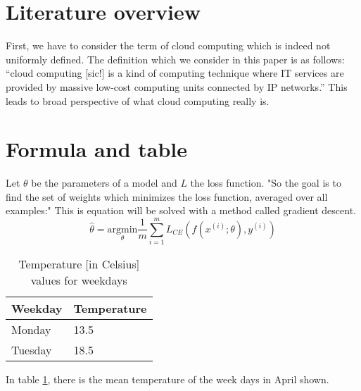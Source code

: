 \documentclass{article}
\begin{document}
\section{Literature overview}
First, we have to consider the term of cloud computing which is indeed not uniformly defined. The definition which we consider in this paper is as follows: \enquote{cloud computing [sic!] is a kind of computing technique where IT services are provided by massive low-cost computing units connected by IP networks.}\cite[p.~627]{qianCloudComputingOverview2009} This leads to broad perspective of what cloud computing really is. 

\section{Formula and table}
Let $\theta$ be the parameters of a model and $L$ the loss function. "So the goal is to find the set of weights which minimizes the loss function, averaged over all examples:"\cite[p.~83]{jurafskySpeechLanguageProcessing2014} This is equation will be solved with a method called gradient descent.
\begin{equation}
	\hat{\theta} = \underset{\theta}{\mathrm{argmin}} \frac{1}{m} \sum_{i=1}^{m}L_{CE}(f(x^{(i)}; \theta),y^{(i)})
	\label{eq:gradient-descent}
\end{equation}


\begin{table}[ht]
	\centering
	\begin{tabular}{@{}ll@{}}
		\toprule
		Weekday & Temperature \\
		\midrule
		Monday & 13.5 \\
		Tuesday & 18.5 \\ \bottomrule
	\end{tabular}
	\caption{Temperature [in Celsius] values for weekdays}
	\label{tab:my-table1}
\end{table}

In table \ref{tab:my-table1}, there is the mean temperature of the week days in April shown. 

\newpage

\end{document}
